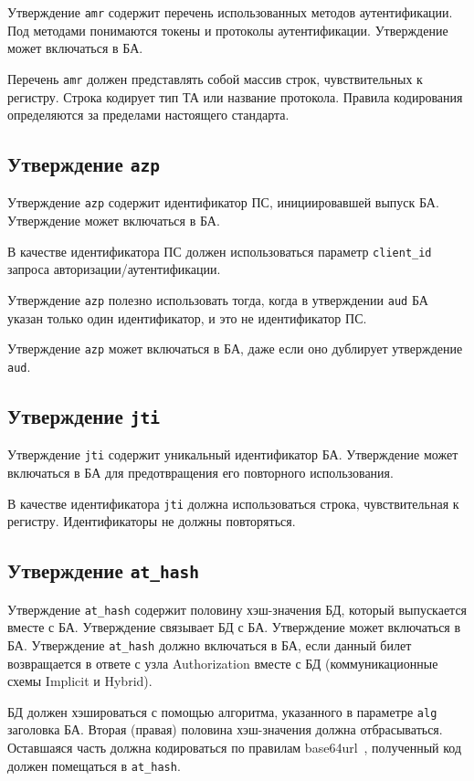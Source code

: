 Утверждение \lstinline{amr} содержит перечень использованных методов
аутентификации. Под методами понимаются токены и протоколы аутентификации.
%
Утверждение может включаться в БА.

Перечень \lstinline{amr} должен представлять собой массив строк,
чувствительных к регистру. Строка кодирует тип ТА или название протокола.
%
Правила кодирования определяются за пределами настоящего стандарта.

\subsection{Утверждение \lstinline{azp}}\label{CLAIMS.Azp}

Утверждение \lstinline{azp} содержит идентификатор ПС, инициировавшей выпуск 
БА. Утверждение может включаться в БА.

В качестве идентификатора ПС должен использоваться параметр 
\lstinline{client_id} запроса авторизации/аутентификации.

Утверждение \lstinline{azp} полезно использовать тогда, когда 
в утверждении \lstinline{aud} БА указан только один идентификатор,
и это не идентификатор ПС.

Утверждение \lstinline{azp} может включаться в БА, даже если оно дублирует 
утверждение \lstinline{aud}.


\subsection{Утверждение \lstinline{jti}}\label{CLAIMS.Jti}

Утверждение \lstinline{jti} содержит уникальный идентификатор БА.
Утверждение может включаться в БА для предотвращения его повторного использования.

В качестве идентификатора \lstinline{jti} должна использоваться строка, 
чувствительная к регистру. Идентификаторы не должны повторяться.

\subsection{Утверждение \lstinline{at_hash}}\label{CLAIMS.AtHash}

Утверждение \lstinline{at_hash} содержит половину хэш-значения БД, который 
выпускается вместе с БА. Утверждение связывает БД с БА. Утверждение может 
включаться в БА.
%
Утверждение \lstinline{at_hash} должно включаться в БА, если данный билет 
возвращается в ответе с узла Authorization вместе с БД (коммуникационные 
схемы Implicit и Hybrid).

БД должен хэшироваться с помощью алгоритма, указанного в параметре
\lstinline{alg} заголовка БА. Вторая (правая) половина хэш-значения 
должна отбрасываться. Оставшаяся часть должна кодироваться по правилам 
base64url~\cite{RFC4648}, полученный код должен помещаться в 
\lstinline{at_hash}.

